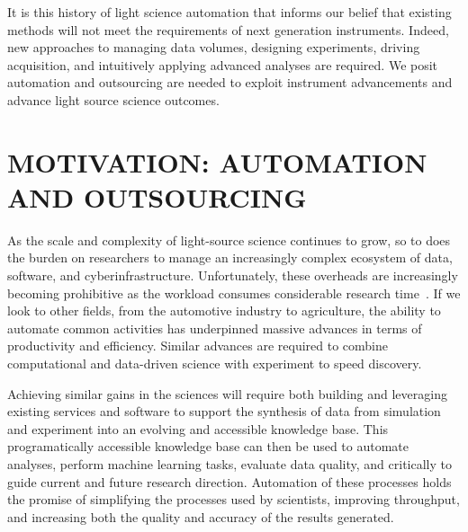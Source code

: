 \documentclass{aip-cp}
\newcommand\ian[1]{}
\newcommand\ryan[1]{}
\newcommand\ian[1]{{\color{red}[Ian: #1]}}
\newcommand\ryan[1]{{\color{green}[Ryan: #1]}}
\begin{document}
It is this history of light science automation that informs our belief that existing methods 
will not meet the requirements of next generation instruments. Indeed, new approaches to managing 
data volumes, designing experiments, driving acquisition, and intuitively applying advanced 
analyses are required. We posit automation and outsourcing are needed to exploit 
instrument advancements and advance light source science outcomes.



\section{MOTIVATION: AUTOMATION AND OUTSOURCING}

\ian{Big picture thoughts I guess.}

\ryan{Use this section as motivation for the following ones? I decided to move automate etc. down 
to its own section and keep this one high level -- like in the talk. Goal of this section is to 
talk about: automation, human-in-the-loop, outsourcing, and motivate the 3 coming sections.}


As the scale and complexity of light-source science continues to grow, so to
does the burden on researchers to manage an increasingly complex ecosystem of
data, software, and cyberinfrastructure.  Unfortunately, these overheads are
increasingly becoming prohibitive as the workload consumes considerable
research time~\cite{}. If we look to other fields, from the automotive
industry to agriculture, the ability to automate common activities has
underpinned massive advances in terms of productivity and efficiency. Similar
advances are required to combine computational and data-driven science with
experiment to speed discovery.


\ryan{Woah this is bad. I will iterate and make it into something decent.}

Achieving similar gains in the sciences will require both building and
leveraging existing services and software to support the synthesis of data
from simulation and experiment into an evolving and accessible knowledge base.
This programatically accessible knowledge base can then be used to automate
analyses, perform machine learning tasks, evaluate data quality, and
critically to guide current and future research direction.  Automation of
these processes holds the promise of simplifying  the processes used by
scientists, improving throughput, and increasing both the quality and accuracy
of the results generated.
\end{document}
